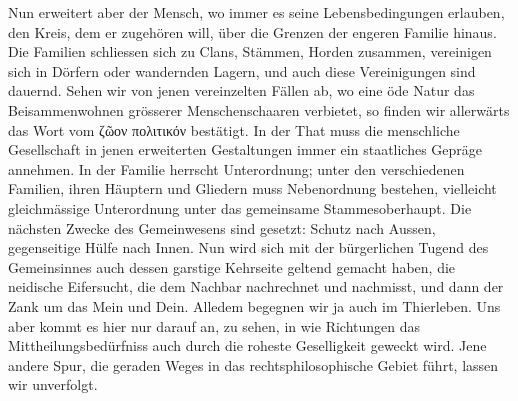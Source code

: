 Nun erweitert aber der Mensch, wo immer es seine Lebensbedingungen erlauben, den Kreis, dem er zugehören will, über die Grenzen der engeren Familie hinaus. Die Familien schliessen sich zu Clans, Stämmen, Horden zusammen, vereinigen sich in Dörfern oder wandernden Lagern, und auch diese Vereinigungen sind dauernd. Sehen wir von jenen vereinzelten Fällen ab, wo eine öde Natur das Beisammenwohnen grösserer Menschenschaaren verbietet, so finden wir allerwärts das Wort vom ζῶον πολιτικόν bestätigt. In der That muss die menschliche Gesellschaft in jenen erweiterten Gestaltungen immer ein staatliches Gepräge annehmen. In der Familie herrscht Unterordnung; unter den verschiedenen Familien, ihren Häuptern und Gliedern muss Nebenordnung bestehen, vielleicht gleichmässige Unterordnung unter das gemeinsame Stammes\-\label{sp.308}oberhaupt. Die nächsten Zwecke des Gemeinwesens sind gesetzt: Schutz nach Aussen, gegenseitige Hülfe nach Innen. Nun wird sich mit der bürgerlichen Tugend des Gemeinsinnes auch dessen garstige Kehrseite geltend gemacht haben, die neidische Eifersucht, die dem Nachbar nachrechnet und nachmisst, und dann der Zank um das Mein und Dein. Alledem begegnen wir ja auch im Thierleben. Uns aber kommt es hier nur darauf an, zu sehen, in wie  Richtungen das Mittheilungsbedürfniss auch durch die roheste Geselligkeit geweckt wird. Jene andere Spur, die geraden Weges in das rechtsphilosophische Gebiet führt, lassen wir unverfolgt.


